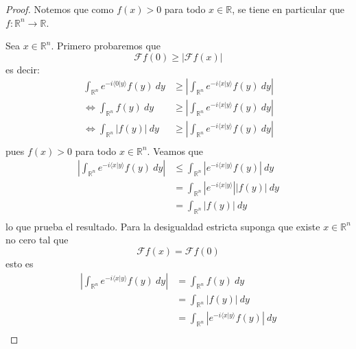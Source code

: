 \documentclass[12pt]{report}
\newcounter{it}
\theoremstyle{largebreak}
\renewcommand{\leq}{\ensuremath{\leqslant}}
\renewcommand{\geq}{\ensuremath{\geqslant}}
\newcommand\abs[1]{\ensuremath{\left|#1\right|}}
\newcommand\cf[3]{\ensuremath{#1:#2\rightarrow#3}}
\newcommand\pint[2]{\ensuremath{\langle#1| #2\rangle}}
\newcommand{\fou}[1]{\ensuremath{\mathcal{F}#1}}
\begin{document}
    \begin{proof}
        Notemos que como $f(x)>0$ para todo $x\in\mathbb{R}$, se tiene en particular que $\cf{f}{\mathbb{R}^n}{\mathbb{R}}$.

        Sea $x\in\mathbb{R}^n$. Primero probaremos que
        \begin{equation*}
            \fou{f}(0)\geq\abs{\fou{f}(x)}
        \end{equation*}
        es decir:
        \begin{equation*}
            \begin{split}
                \int_{\mathbb{R}^n}e^{ -i\pint{0}{y}}f(y)\:dy&\geq\abs{\int_{\mathbb{R}^n}e^{ -i\pint{x}{y}}f(y)\:dy}\\
                \iff\int_{\mathbb{R}^n}f(y)\:dy&\geq\abs{\int_{\mathbb{R}^n}e^{ -i\pint{x}{y}}f(y)\:dy}\\
                \iff\int_{\mathbb{R}^n}\abs{f(y)}\:dy&\geq\abs{\int_{\mathbb{R}^n}e^{ -i\pint{x}{y}}f(y)\:dy}\\
            \end{split}
        \end{equation*}
        pues $f(x)>0$ para todo $x\in\mathbb{R}^n$. Veamos que
        \begin{equation}
            \begin{split}
                \abs{\int_{\mathbb{R}^n}e^{ -i\pint{x}{y}}f(y)\:dy}&\leq\int_{\mathbb{R}^n}\abs{e^{ -i\pint{x}{y}}f(y)}\:dy\\
                &=\int_{\mathbb{R}^n}\abs{e^{ -i\pint{x}{y}}}\abs{f(y)}\:dy\\
                &=\int_{\mathbb{R}^n}\abs{f(y)}\:dy\\
            \end{split}
        \end{equation}
        lo que prueba el resultado. Para la desigualdad estricta suponga que existe $x\in\mathbb{R}^n$ no cero tal que
        \begin{equation*}
            \fou{f}(x)=\fou{f}(0)
        \end{equation*}
        esto es
        \begin{equation*}
            \begin{split}
                \abs{\int_{\mathbb{R}^n}e^{ -i\pint{x}{y}}f(y)\:dy}&=\int_{\mathbb{R}^n}f(y)\:dy\\
                &=\int_{\mathbb{R}^n}\abs{f(y)}\:dy\\
                &=\int_{\mathbb{R}^n}\abs{e^{ -i\pint{x}{y}}f(y)}\:dy\\

\end{split}
\end{equation*}
\end{proof}
\end{document}
